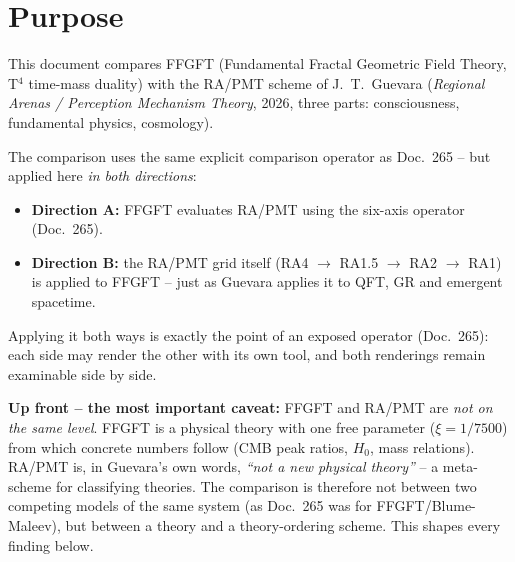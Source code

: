%
%

\section*{Purpose}

This document compares FFGFT (Fundamental Fractal Geometric Field Theory,
T$^4$ time-mass duality) with the RA/PMT scheme of J.~T.~Guevara
(\emph{Regional Arenas / Perception Mechanism Theory}, 2026, three parts:
consciousness, fundamental physics, cosmology).

The comparison uses the same explicit comparison operator as Doc.~265 --
but applied here \emph{in both directions}:

\begin{itemize}
  \item \textbf{Direction A:} FFGFT evaluates RA/PMT using the
        six-axis operator (Doc.~265).
  \item \textbf{Direction B:} the RA/PMT grid itself
        (RA4 $\to$ RA1.5 $\to$ RA2 $\to$ RA1) is applied to FFGFT --
        just as Guevara applies it to QFT, GR and emergent spacetime.
\end{itemize}

Applying it both ways is exactly the point of an exposed operator
(Doc.~265): each side may render the other with its own tool, and both
renderings remain examinable side by side.

\textbf{Up front -- the most important caveat:} FFGFT and RA/PMT are
\emph{not on the same level}. FFGFT is a physical theory with one free
parameter ($\xi = 1/7500$) from which concrete numbers follow (CMB peak
ratios, $H_0$, mass relations). RA/PMT is, in Guevara's own words,
\emph{``not a new physical theory''} -- a meta-scheme for classifying
theories. The comparison is therefore not between two competing models
of the same system (as Doc.~265 was for FFGFT/Blume-Maleev), but between
a theory and a theory-ordering scheme. This shapes every finding below.

